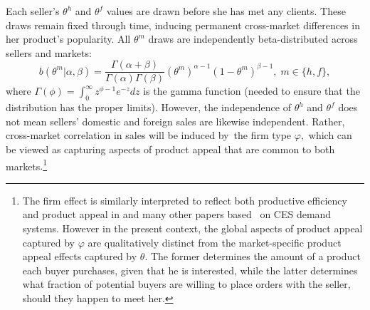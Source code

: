 Each seller's $\theta ^{h}$ and $\theta ^{f}$ values are drawn before she
has met any clients. These draws remain fixed through time, inducing
permanent cross-market differences in her product's popularity. All $\theta
^{m}$ draws are independently beta-distributed across sellers and markets:%
\begin{equation*}
b(\theta ^{m}|\alpha ,\beta )=\frac{\Gamma (\alpha +\beta )}{\Gamma (\alpha
)\Gamma (\beta )}\left( \theta ^{m}\right) ^{\alpha -1}(1-\theta
^{m})^{\beta -1},\;m\in \{h,f\},
\end{equation*}%
where $\Gamma (\phi )=\int_{0}^{\infty }z^{\phi -1}e^{-z}dz$ is the gamma
function (needed to ensure that the distribution has the proper limits).
However, the independence of $\theta ^{h}$ and $\theta ^{f}$ does not mean
sellers' domestic and foreign sales are likewise independent. Rather,
cross-market correlation in sales will be induced by\ the firm type $\varphi
,$ which can be viewed as capturing aspects of product appeal that are
common to both markets$.$\footnote{%
The firm effect is similarly interpreted to reflect both productive
efficiency and product appeal in \citet{melitz2003impact} and many other papers based \
on CES demand systems. However in the present context, the global aspects of
product appeal captured by $\varphi $ are qualitatively distinct from the
market-specific product appeal effects captured by $\theta $. The former
determines the amount of a product each buyer purchases, given that he is
interested, while the latter determines what fraction of potential buyers
are willing to place orders with the seller, should they happen to meet
her.\medskip}

